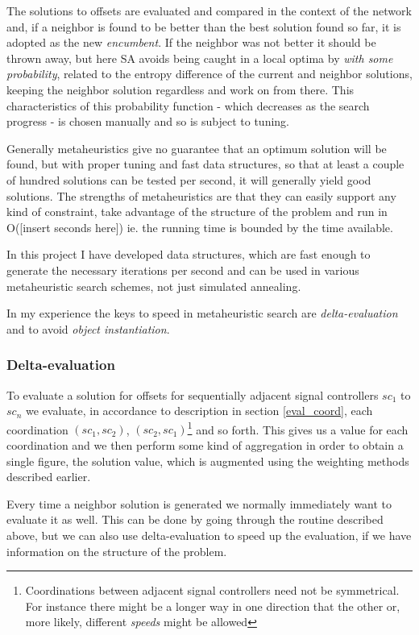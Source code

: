The solutions to offsets are evaluated and compared in the context of the network and, if a neighbor is found to be better than the best solution found so far, it is adopted as the new \textit{encumbent}. If the neighbor was not better it should be thrown away, but here SA avoids being caught in a local optima by \textit{with some probability}, related to the entropy difference of the current and neighbor solutions, keeping the neighbor solution regardless and work on from there. This characteristics of this probability function - which decreases as the search progress  - is chosen manually and so is subject to tuning.

Generally metaheuristics give no guarantee that an optimum solution will be found, but with proper tuning and fast data structures, so that at least a couple of hundred solutions can be tested per second, it will generally yield good solutions. The strengths of metaheuristics are that they can easily support any kind of constraint, take advantage of the structure of the problem and run in O([insert seconds here]) ie. the running time is bounded by the time available.

In this project I have developed data structures, which are fast enough to generate the necessary iterations per second and can be used in various metaheuristic search schemes, not just simulated annealing.

In my experience the keys to speed in metaheuristic search are \textit{delta-evaluation} and to avoid \textit{object instantiation}.

\subsubsection{Delta-evaluation}
To evaluate a solution for offsets for sequentially adjacent signal controllers $sc_1$ to $sc_n$ we evaluate, in accordance to description in section \ref{eval_coord}, each coordination $(sc_1,sc_2)$, $(sc_2,sc_1)$\footnote{Coordinations between adjacent signal controllers need not be symmetrical. For instance there might be a longer way in one direction that the other or, more likely, different \textit{speeds} might be allowed} and so forth. This gives us a value for each coordination and we then perform some kind of aggregation in order to obtain a single figure, the solution value, which is augmented using the weighting methods described earlier.

Every time a neighbor solution is generated we normally immediately want to evaluate it as well. This can be done by going through the routine described above, but we can also use delta-evaluation to speed up the evaluation, if we have information on the structure of the problem.

